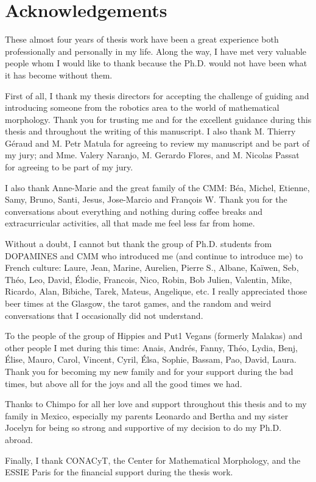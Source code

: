 \chapter*{Acknowledgements}

These almost four years of thesis work have been a great experience both professionally and personally in my life. Along the way, I have met very valuable people whom I would like to thank because the Ph.D. would not have been what it has become without them.

 First of all, I thank my thesis directors for accepting the challenge of guiding and introducing someone from the robotics area to the world of mathematical morphology. Thank you for trusting me and for the excellent guidance during this thesis and throughout the writing of this manuscript. I also thank M. Thierry Géraud and M. Petr Matula for agreeing to review my manuscript and be part of my jury; and Mme. Valery Naranjo, M. Gerardo Flores, and M. Nicolas Passat for agreeing to be part of my jury. 

 I also thank Anne-Marie and the great family of the CMM: Béa, Michel, Etienne, Samy, Bruno, Santi, Jesus, Jose-Marcio and François W. Thank you for the conversations about everything and nothing during coffee breaks and extracurricular activities, all that made me feel less far from home.

 Without a doubt, I cannot but thank the group of Ph.D. students from DOPAMINES and CMM who introduced me (and continue to introduce me) to French culture: Laure, Jean, Marine, Aurelien, Pierre S., Albane, Kaïwen, Seb, Théo, Leo, David, Élodie, Francois, Nico, Robin, Bob Julien, Valentin, Mike, Ricardo, Alan, Bibiche, Tarek, Mateus, Angelique, etc. I really appreciated those beer times at the Glasgow, the tarot games, and the random and weird conversations that I occasionally did not understand.

 To the people of the group of Hippies and Put1 Vegans (formerly Malakas) and other people I met during this time: Anais, Andrés, Fanny, Théo, Lydia, Benj, Élise, Mauro, Carol, Vincent, Cyril, Élsa, Sophie, Bassam, Pao, David, Laura. Thank you for becoming my new family and for your support during the bad times, but above all for the joys and all the good times we had.

 Thanks to Chimpo for all her love and support throughout this thesis and to my family in Mexico, especially my parents Leonardo and Bertha and my sister Jocelyn for being so strong and supportive of my decision to do my Ph.D. abroad.

 Finally, I thank CONACyT, the Center for Mathematical Morphology, and the ESSIE Paris for the financial support during the thesis work.